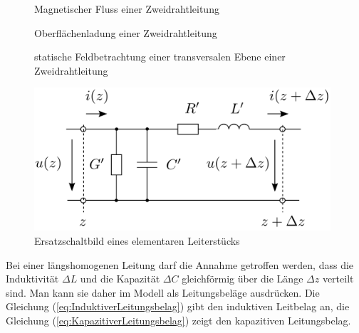 \begin{figure}[!h]
\begin{minipage}{7cm}
	\centering
	\caption{Magnetischer Fluss einer Zweidrahtleitung}	
\end{minipage}
\hfill
\begin{minipage}{7cm}
	\centering
	\caption{Oberflächenladung einer Zweidrahtleitung}		
\end{minipage}
\label{fig:statischeZeidrahtleitung}
\caption{statische Feldbetrachtung einer transversalen Ebene einer Zweidrahtleitung}
\end{figure}

\begin{figure}[!ht]
	\centering
	\includegraphics[width=11cm]{content/bilder/Leiterstueck.pdf}%
	\caption{Ersatzschaltbild eines elementaren Leiterstücks}
	\label{fig:ESBLeiterstueck}
\end{figure}
Bei einer längshomogenen Leitung darf die Annahme getroffen werden, dass die Induktivität $\Delta L$ und die Kapazität $\Delta C$ gleichförmig über die Länge $\Delta z$ verteilt sind. Man kann sie daher im Modell als Leitungsbeläge ausdrücken. Die Gleichung (\ref{eq:InduktiverLeitungsbelag}) gibt den induktiven Leitbelag an, die Gleichung (\ref{eq:KapazitiverLeitungsbelag}) zeigt den kapazitiven Leitungsbelag.

